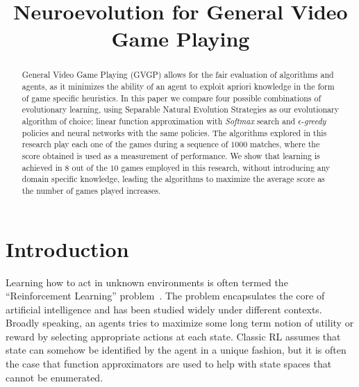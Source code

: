 \documentclass[conference]{IEEEtran}
\begin{document}
%
\title{Neuroevolution for General Video Game Playing}

\author{
}


\maketitle


\begin{abstract}
General Video Game Playing (GVGP) allows for the fair evaluation of algorithms and agents, as it minimizes the ability of an agent to exploit apriori knowledge in the form of game specific heuristics. In this paper we compare four possible combinations of evolutionary learning, using Separable Natural Evolution Strategies as our evolutionary algorithm of choice; linear function approximation with \textit{Softmax} search and $\epsilon$-\textit{greedy} policies and neural networks with the same policies. The algorithms explored in this research play each one of the games during a sequence of $1000$ matches, where the score obtained is used as a measurement of performance. We show that learning is achieved in $8$ out of the $10$ games employed in this research, without introducing any domain specific knowledge, leading the algorithms to maximize the average score as the number of games played increases.

\end{abstract}

\IEEEpeerreviewmaketitle

\section{Introduction} \label{sec:intro}

Learning how to act in unknown environments is often termed the ``Reinforcement Learning'' problem~\cite{sutton1998introduction}. The problem encapsulates the core of artificial intelligence and has been studied widely under different contexts. Broadly speaking, an agents tries to maximize some long term notion of utility or reward by selecting appropriate actions at each state. Classic RL assumes that state can somehow be identified by the agent in a unique fashion, but it is often the case that function approximators are used to help with state spaces that cannot be enumerated. 
\end{document}
